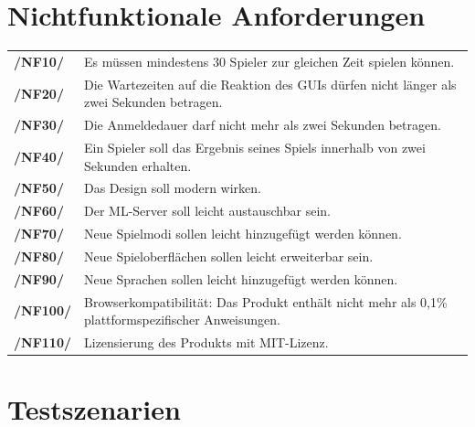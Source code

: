 \documentclass[a4paper]{scrreprt}
\begin{document}
    \chapter{Nichtfunktionale Anforderungen}

    \begin{tabularx}{\linewidth}{@{}>{\bfseries}l@{\hspace{.5em}}X@{}}
        /NF10/ & Es müssen mindestens 30 Spieler zur gleichen Zeit spielen können.\\
        /NF20/ & Die Wartezeiten auf die Reaktion des GUIs dürfen nicht länger als zwei Sekunden betragen. \\
	/NF30/ & Die Anmeldedauer darf nicht mehr als zwei Sekunden betragen. \\
        /NF40/ & Ein Spieler soll das Ergebnis seines Spiels innerhalb von zwei Sekunden erhalten. \\
        /NF50/ & Das Design soll modern wirken. \\
        /NF60/ & Der \Gls{ML-Server} soll leicht austauschbar sein. \\
        /NF70/ & Neue Spielmodi sollen leicht hinzugefügt werden können. \\
        /NF80/ & Neue Spieloberflächen sollen leicht erweiterbar sein. \\
        /NF90/ & Neue Sprachen sollen leicht hinzugefügt werden können. \\
        /NF100/ & Browserkompatibilität: Das Produkt enthält nicht mehr als 0,1\% plattformspezifischer Anweisungen. \\
        /NF110/ & Lizensierung des Produkts mit MIT-Lizenz.
    \end{tabularx}

    \chapter{Testszenarien}
\end{document}
